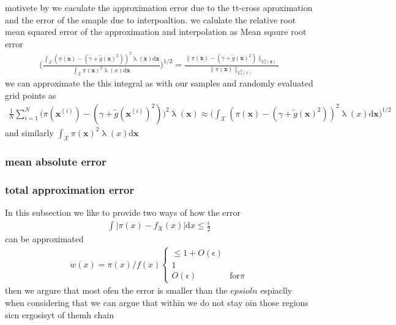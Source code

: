 motivete by \cite{Rohrbach2022tterror}
we caculate the approximation error due to the tt-cross aproximation 
and the error of the smaple due to interpoaltion.
we calulate the relative root mean squared error of the approximation and interpolation as
Mean sqaure root error
\begin{align}
 \Bigg( \frac{ \int_{\mathcal{X}} (\pi(\bm{x}) - (\gamma + \tilde{g}(\bm{x})^2))^2 \uplambda(\bm{x}) \text{d} \bm{x}}{ \int_{\mathcal{X}} \pi(\bm{x})^2 \uplambda(x)  \text{d} \bm{x} } \Bigg)^{1/2} =	\frac{\lVert 	\pi(\bm{x}) - (\gamma + \tilde{g}(\bm{x})^2)  \rVert_{L^2_{\uplambda}(\bm{x})}}{\lVert 	\pi(\bm{x}) \rVert_{L^2_{\uplambda}(x)}  }
\end{align}
we can approximate the this integral as with our samples and randomly evaluated grid points as 
\begin{align}
	\frac{1}{N} \sum^{N}_{i =1} \big(\pi(\bm{x}^{(i)}) - (\gamma + \tilde{g}(\bm{x}^{(i)})^2)\big)^2 \uplambda(\bm{x})   \approx \Bigg(  \int_{\mathcal{X}} (\pi(\bm{x}) - (\gamma + \tilde{g}(\bm{x})^2))^2 \uplambda(x) \text{d} \bm{x} \Bigg)^{1/2} 
\end{align}
and similarly $\int_{\mathcal{X}} \pi(\bm{x})^2 \uplambda(x)  \text{d} \bm{x}$
 
\subsubsection{mean absolute error}

\subsubsection{total approximation error}


In this subsection we like to provide two ways of how the error
\begin{align}
 \int | \pi(x) - f_{X}(x) | \text{d} x \leq \frac{\epsilon}{2} 
\end{align}
can be approximated
\begin{align}
	w(x) = \pi(x)/f(x)
	\begin{cases}
		\leq 1 + O(\epsilon) &\\
		1 &\\
		O(\epsilon) & \text{for} \pi  
	\end{cases}
\end{align}
then we argure that most ofen the error is 
smaller than the $epsioln$
espiaclly when considering that 
we can argue that within we do not stay oin those regions sicn ergosisyt of themh chain 




